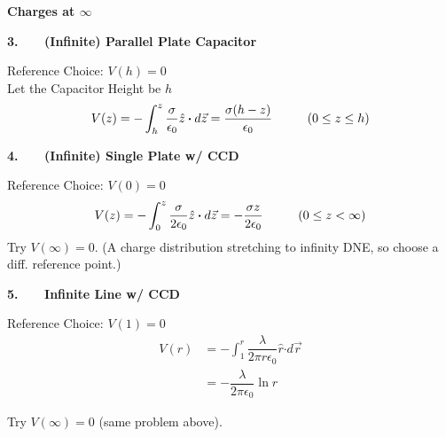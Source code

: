 \documentclass[12pt]{article}
\newcommand{\dotP}{\boldsymbol \cdot}		%
\begin{document}
\begin{minipage}[t]{0.48\textwidth}
	\noindent \textbf{Charges at \(\infty\)}

	\vspace{30pt}
	\textbf{3. \ \ \ (Infinite) Parallel Plate Capacitor}

	\vspace{15pt}
	Reference Choice: \( V(h) = 0 \)\\[15pt]
	Let the Capacitor Height be \(h\) 
	\[ V( z ) = - \int_{h}^{z} \frac{\sigma}{\epsilon_0} \hat{z} \dotP d\vec{z}
		= \frac{\sigma (h-z)}{\epsilon_0} 
		\ \ \ \ \indent (0 \leq z \leq h)
	\]
	
	\vspace{10pt}
	\textbf{4. \ \ \ (Infinite) Single Plate w/ CCD}

	\vspace{15pt}
	Reference Choice: \( V(0) = 0 \)
	\[ V( z ) = - \int_{0}^{z} \frac{\sigma}{2 \epsilon_0} \hat{z} \dotP d\vec{z}
		= - \frac{\sigma z}{2 \epsilon_0} 
		\ \ \ \ \indent (0 \leq z < \infty) 
	\]
	\hfill \break 
	Try \( V(\infty) = 0 \). (A charge distribution 
		stretching to infinity DNE, so choose a diff. reference point.)
	
	\vspace{20pt}
	\textbf{5. \ \ \ Infinite Line w/ CCD}

	\vspace{15pt}
	Reference Choice: \( V(1) = 0 \)
	\begin{align*}
		V(r) &= - \int_{1}^{r} \dfrac{ \lambda }{2 \pi r \epsilon_0} \hat{r} \dotP d\vec{r} \\
		&= - \dfrac{ \lambda }{2 \pi \epsilon_0} \ln{r}
	\end{align*}

	Try \( V(\infty) = 0 \) (same problem above).
\end{minipage}
\hspace{10pt}
\end{document}
